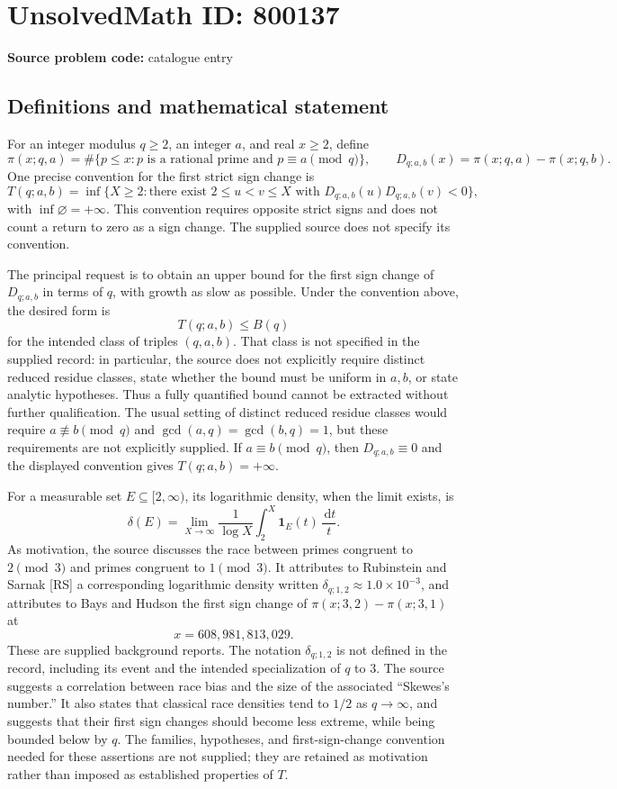 \documentclass[11pt]{article}
\newcommand{\dd}{\,\mathrm{d}}
\begin{document}
\section*{UnsolvedMath ID: 800137}
\textbf{Source problem code:} catalogue entry
\subsection{Definitions and mathematical statement}
For an integer modulus \(q\geq 2\), an integer \(a\), and real \(x\geq 2\), define
\[
\pi(x;q,a)=\#\{p\leq x:p\text{ is a rational prime and }p\equiv a\pmod q\},
\qquad D_{q;a,b}(x)=\pi(x;q,a)-\pi(x;q,b).
\]
One precise convention for the first strict sign change is
\[
T(q;a,b)=\inf\{X\geq 2:\text{there exist }2\leq u<v\leq X\text{ with }D_{q;a,b}(u)D_{q;a,b}(v)<0\},
\]
with \(\inf\varnothing=+\infty\). This convention requires opposite strict signs and does not count a return to zero as a sign change. The supplied source does not specify its convention.

The principal request is to obtain an upper bound for the first sign change of \(D_{q;a,b}\) in terms of \(q\), with growth as slow as possible. Under the convention above, the desired form is
\[
T(q;a,b)\leq B(q)
\]
for the intended class of triples \((q,a,b)\). That class is not specified in the supplied record: in particular, the source does not explicitly require distinct reduced residue classes, state whether the bound must be uniform in \(a,b\), or state analytic hypotheses. Thus a fully quantified bound cannot be extracted without further qualification. The usual setting of distinct reduced residue classes would require \(a\not\equiv b\pmod q\) and \(\gcd(a,q)=\gcd(b,q)=1\), but these requirements are not explicitly supplied. If \(a\equiv b\pmod q\), then \(D_{q;a,b}\equiv0\) and the displayed convention gives \(T(q;a,b)=+\infty\).

For a measurable set \(E\subseteq[2,\infty)\), its logarithmic density, when the limit exists, is
\[
\delta(E)=\lim_{X\to\infty}\frac{1}{\log X}\int_2^X\mathbf{1}_E(t)\,\frac{\dd t}{t}.
\]
As motivation, the source discusses the race between primes congruent to \(2\pmod3\) and primes congruent to \(1\pmod3\). It attributes to Rubinstein and Sarnak [RS] a corresponding logarithmic density written \(\delta_{q;1,2}\approx1.0\times10^{-3}\), and attributes to Bays and Hudson the first sign change of \(\pi(x;3,2)-\pi(x;3,1)\) at
\[
x=608{,}981{,}813{,}029.
\]
These are supplied background reports. The notation \(\delta_{q;1,2}\) is not defined in the record, including its event and the intended specialization of \(q\) to \(3\). The source suggests a correlation between race bias and the size of the associated ``Skewes's number.'' It also states that classical race densities tend to \(1/2\) as \(q\to\infty\), and suggests that their first sign changes should become less extreme, while being bounded below by \(q\). The families, hypotheses, and first-sign-change convention needed for these assertions are not supplied; they are retained as motivation rather than imposed as established properties of \(T\).
\end{document}
